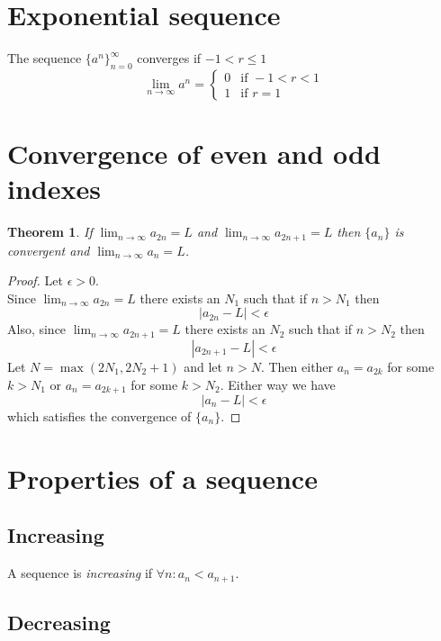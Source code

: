 \documentclass[a4paper]{article}
\begin{document}
\section{Exponential sequence} %

The sequence \({\{a^n\}}_{n=0}^\infty\) converges if \(-1<r\leq 1\)
\[
    \lim_{n\to\infty} a^n = \begin{cases}
        0 & \text{if } -1 < r < 1 \\
        1 & \text{if } r=1
    \end{cases}
\]

\pagebreak

\section{Convergence of even and odd indexes}

\newtheorem*{theorem1}{Theorem}

\begin{theorem1}
    If \(\lim_{n\to\infty}a_{2n}=L\) and \(\lim_{n\to\infty}a_{2n+1}=L\)
    then \(\{a_n\}\) is convergent and \(\lim_{n\to\infty}a_n=L\).
\end{theorem1}
\begin{proof}
    Let \(\epsilon>0\). \\
    Since \(\lim_{n\to\infty}a_{2n}=L\) there exists an \(N_1\) such that
    if \(n>N_1\) then
    \[
        |a_{2n}-L|<\epsilon
    \]
    Also, since \(\lim_{n\to\infty}a_{2n+1}=L\) there exists an \(N_2\) such that
    if \(n>N_2\) then
    \[
        |a_{2n+1}-L|<\epsilon
    \]
    Let \(N=\max(2N_1, 2N_2+1)\) and let \(n>N\).
    Then either \(a_n=a_{2k}\) for some \(k>N_1\) or \(a_n=a_{2k+1}\)
    for some \(k>N_2\). Either way we have
    \[
        |a_n-L|<\epsilon
    \]
    which satisfies the convergence of \(\{a_n\}\).
\end{proof}

\section{Properties of a sequence}

\subsection{Increasing}

A sequence is \textit{increasing} if \(\forall n:  a_n<a_{n+1}\).

\subsection{Decreasing}
\end{document}
